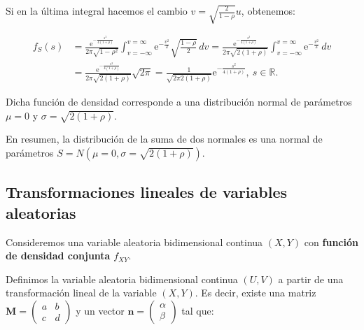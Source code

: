 \documentclass[
  letterpaper,
  DIV=11,
  numbers=noendperiod]{scrreprt}
\begin{document}
Si en la última integral hacemos el cambio
\(v=\sqrt{\frac{2}{1-\rho}}u\), obtenemos:

\[
\begin{array}{rl}
f_S(s)  & = \frac{\mathrm{e}^{-\frac{s^2}{4(1+\rho)}}}{2\pi\sqrt{1-\rho^2}}\int_{v=-\infty}^{v=\infty}\mathrm{e}^{-\frac{v^2}{2}} \sqrt{\frac{1-\rho}{2}}\, dv= \frac{\mathrm{e}^{-\frac{s^2}{4(1+\rho)}}}{2\pi\sqrt{2(1+\rho)}}\int_{v=-\infty}^{v=\infty}\mathrm{e}^{-\frac{v^2}{2}} \, dv \\ & = \frac{\mathrm{e}^{-\frac{s^2}{4(1+\rho)}}}{2\pi\sqrt{2(1+\rho)}} \sqrt{2\pi}= \frac{1}{\sqrt{2\pi 2(1+\rho)}}\mathrm{e}^{-\frac{s^2}{4(1+\rho)}},\ s\in\mathbb{R}.
\end{array}
\]

Dicha función de densidad corresponde a una distribución normal de
parámetros \(\mu =0\) y \(\sigma = \sqrt{2(1+\rho)}\).

En resumen, la distribución de la suma de dos normales es una normal de
parámetros \(S=N(\mu=0,\sigma = \sqrt{2(1+\rho)})\).

\hypertarget{transformaciones-lineales-de-variables-aleatorias}{%
\subsection{Transformaciones lineales de variables
aleatorias}\label{transformaciones-lineales-de-variables-aleatorias}}

Consideremos una variable aleatoria bidimensional continua \((X,Y)\) con
\textbf{función de densidad conjunta} \(f_{XY}\).

Definimos la variable aleatoria bidimensional continua \((U,V)\) a
partir de una transformación lineal de la variable \((X,Y)\). Es decir,
existe una matriz
\(\mathbf{M}=\begin{pmatrix}a & b\\ c& d\end{pmatrix}\) y un vector
\(\mathbf{n}=\begin{pmatrix}\alpha\\\beta \end{pmatrix}\) tal que:
\end{document}
